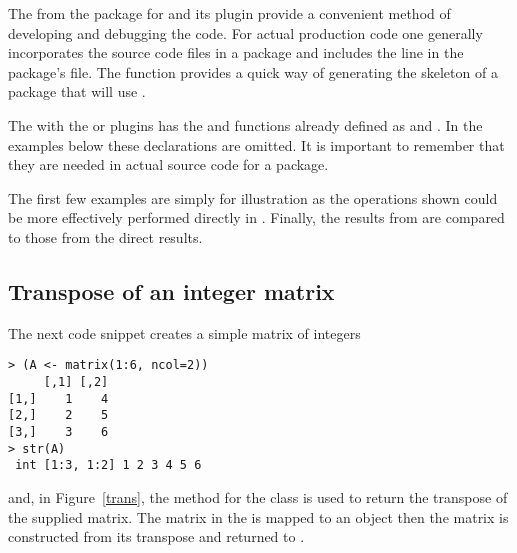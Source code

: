 \documentclass[shortnames,article]{jss}
\begin{document}
The  from the  package \citep*{CRAN:inline} for
 and its  plugin provide a convenient method of
developing and debugging the  code.  For actual production code
one generally incorporates the  source code files in a package
and includes the line  in the package's
 file.  The  function
provides a quick way of generating the skeleton of a package that will use
.

The  with the  or 
plugins has the  and  functions already defined as
 and .  In the examples below
these declarations are omitted.  It is important to remember that they are
needed in actual  source code for a package.

The first few examples are simply for illustration as the operations
shown could be more effectively performed directly in .
Finally, the results from  are compared to those from the direct
 results.

\subsection{Transpose of an integer matrix}
\label{sec:transpose}

The next  code snippet creates a simple matrix of integers
\begin{verbatim}
> (A <- matrix(1:6, ncol=2))
     [,1] [,2]
[1,]    1    4
[2,]    2    5
[3,]    3    6
> str(A)
 int [1:3, 1:2] 1 2 3 4 5 6
\end{verbatim}
and, in Figure~\ref{trans}, the  method for the
 class is used to return the transpose of the supplied matrix. The 
matrix in the   is mapped to an
 object then the matrix  is constructed
from its transpose and returned to .
\end{document}
